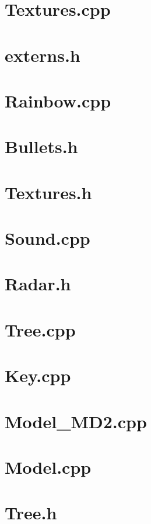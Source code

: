 \section*{Textures.cpp}

\pagebreak
\section*{externs.h}

\pagebreak
\section*{Rainbow.cpp}

\pagebreak
\section*{Bullets.h}

\pagebreak
\section*{Textures.h}

\pagebreak
\section*{Sound.cpp}

\pagebreak
\section*{Radar.h}

\pagebreak
\section*{Tree.cpp}

\pagebreak
\section*{Key.cpp}

\pagebreak
\section*{Model\_MD2.cpp}

\pagebreak
\section*{Model.cpp}

\pagebreak
\section*{Tree.h}

\pagebreak
